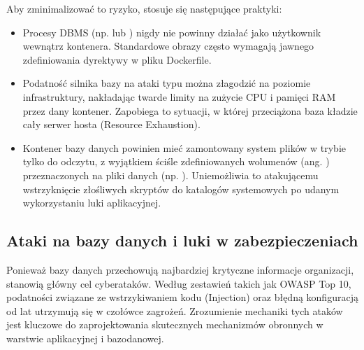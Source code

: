 \documentclass[letterpaper,10pt,polish]{sphinxmanual}
\begin{document}
\sphinxAtStartPar
Aby zminimalizować to ryzyko, stosuje się następujące praktyki:
\begin{itemize}
\item {} 
\sphinxAtStartPar
{} Procesy DBMS (np.  lub ) nigdy nie powinny działać jako użytkownik  wewnątrz kontenera. Standardowe obrazy często wymagają jawnego zdefiniowania dyrektywy  w pliku Dockerfile.

\item {} 
\sphinxAtStartPar
{} Podatność silnika bazy na ataki typu  można złagodzić na poziomie infrastruktury, nakładając twarde limity na zużycie CPU i pamięci RAM przez dany kontener. Zapobiega to sytuacji, w której przeciążona baza kładzie cały serwer hosta (Resource Exhaustion).

\item {} 
\sphinxAtStartPar
{} Kontener bazy danych powinien mieć zamontowany system plików w trybie tylko do odczytu, z wyjątkiem ściśle zdefiniowanych wolumenów (ang. ) przeznaczonych na pliki danych (np. ). Uniemożliwia to atakującemu wstrzyknięcie złośliwych skryptów do katalogów systemowych po udanym wykorzystaniu luki aplikacyjnej.

\end{itemize}

\sphinxstepscope


\subsection{Ataki na bazy danych i luki w zabezpieczeniach}
\label{\detokenize{rozdzia_u0142_2/rozdzia_u0142_27/rozdzial_2:ataki-na-bazy-danych-i-luki-w-zabezpieczeniach}}\label{\detokenize{rozdzia_u0142_2/rozdzia_u0142_27/rozdzial_2::doc}}
\sphinxAtStartPar
Ponieważ bazy danych przechowują najbardziej krytyczne informacje organizacji, stanowią główny cel cyberataków. Według zestawień takich jak OWASP Top 10, podatności związane ze wstrzykiwaniem kodu (Injection) oraz błędną konfiguracją od lat utrzymują się w czołówce zagrożeń. Zrozumienie mechaniki tych ataków jest kluczowe do zaprojektowania skutecznych mechanizmów obronnych w warstwie aplikacyjnej i bazodanowej.
\end{document}
